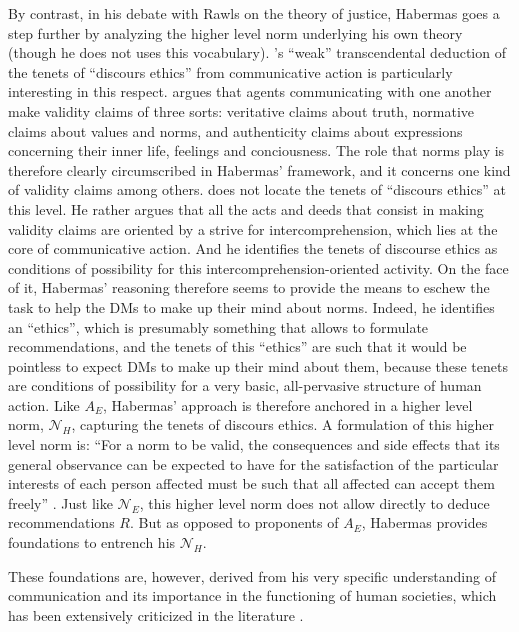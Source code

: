 \documentclass[preprint, french, english, 11pt, authoryear]{elsarticle}%
\begin{document}
By contrast, in his debate with Rawls on the theory of justice, Habermas goes a step further by analyzing the higher level norm underlying his own theory (though he does not uses this vocabulary). \cite{habermas_moralbewustsein_1983}'s “weak” transcendental deduction of the tenets of “discours ethics” from communicative action is particularly interesting in this respect. \citet{habermas_theorie_1981} argues that agents communicating with one another make validity claims of three sorts: veritative claims about truth, normative claims about values and norms, and authenticity claims about expressions concerning their inner life, feelings and conciousness. The role that norms play is therefore clearly circumscribed in Habermas' framework, and it concerns one kind of validity claims among others. \cite{habermas_moralbewustsein_1983} does not locate the tenets of “discours ethics” at this level. He rather argues that all the acts and deeds that consist in making validity claims are oriented by a strive for intercomprehension, which lies at the core of communicative action. And he identifies the tenets of discourse ethics as conditions of possibility for this intercomprehension-oriented activity. On the face of it, Habermas' reasoning therefore seems to provide the means to eschew the task to help the \acp{DM} to make up their mind about norms. Indeed, he identifies an “ethics”, which is presumably something that allows to formulate recommendations, and the tenets of this “ethics” are such that it would be pointless to expect \acp{DM} to make up their mind about them, because these tenets are conditions of possibility for a very basic, all-pervasive structure of human action. Like $A_E$, Habermas' approach is therefore anchored in a higher level norm, $\mathscr{N}_{H}$, capturing the tenets of discours ethics. A formulation of this higher level norm is: “For a norm to be valid, the consequences and side effects that its general observance can be expected to have for the satisfaction of the particular interests of each person affected must be such that all affected can accept them freely” \citep{habermas_moralbewustsein_1983}. Just like $\mathscr{N}_E$, this higher level norm does not allow directly to deduce recommendations $R$. But as opposed to proponents of $A_E$, Habermas provides foundations to entrench his $\mathscr{N}_{H}$. 

These foundations are, however, derived from his very specific understanding of communication and its importance in the functioning of human societies, which has been extensively criticized in the literature \citep{heath_communicative_2001,honneth_kritik_1985}. 
\end{document}
